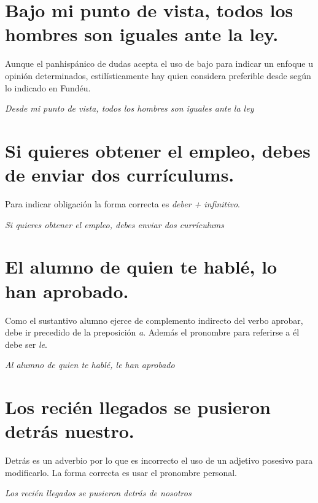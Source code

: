 \documentclass[12pt, a4paper, oneside]{report}
\begin{document}
        \section{\color{rojo}Bajo\color{negro} \;mi punto de vista, todos los hombres son iguales ante la
        ley.}
        Aunque el panhispánico de dudas acepta el uso de bajo para indicar un enfoque u opinión determinados,
        estilísticamente hay quien considera preferible desde según lo indicado en Fundéu.
        \begin{center}
            \textit{\color{verde}Desde\color{negro} \;mi punto de vista, todos los hombres son iguales ante la
            ley}
        \end{center}

        \section{Si quieres obtener el empleo, \color{rojo}debes de\color{negro} \;enviar dos currículums.}
        Para indicar obligación la forma correcta es \emph{deber + infinitivo}.
        \begin{center}
            \textit{Si quieres obtener el empleo, \color{verde}debes\color{negro} \;enviar dos currículums}
        \end{center}

        \section{\color{rojo}El alumno\color{negro} \;de quien te hablé, \color{rojo}lo\color{negro} \; han
        aprobado.}
        Como el sustantivo alumno ejerce de complemento indirecto del verbo aprobar, debe ir precedido de la
        preposición \emph{a}. Además el pronombre para referirse a él debe ser \emph{le}.
        \begin{center}
            \textit{\color{verde}Al alumno\color{negro} \;de quien te hablé, \color{verde}le\color{negro} \;han aprobado}
        \end{center}

        \section{Los recién llegados se pusieron detrás \color{rojo}nuestro\color{negro}.}
        Detrás es un adverbio por lo que es incorrecto el uso de un adjetivo posesivo para modificarlo. La
        forma correcta es usar el pronombre personal.
        \begin{center}
            \textit{Los recién llegados se pusieron detrás \color{verde}de nosotros\color{negro}}
        \end{center}
\end{document}
